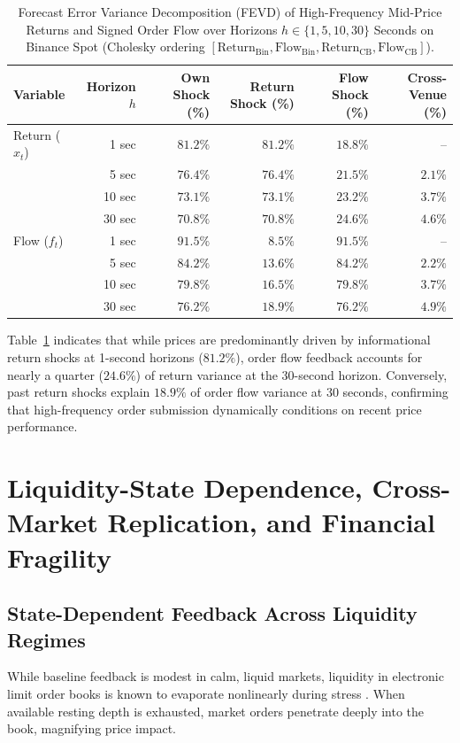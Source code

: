 \documentclass[12pt]{article}
\theoremstyle{definition}
\theoremstyle{remark}
\begin{document}
\begin{table}[htbp]
\centering\footnotesize
\setlength{\tabcolsep}{4pt}
\caption{Forecast Error Variance Decomposition (FEVD) of High-Frequency Mid-Price Returns and Signed Order Flow over Horizons $h \in \{1, 5, 10, 30\}$ Seconds on Binance Spot (Cholesky ordering $[\text{Return}_{\text{Bin}}, \text{Flow}_{\text{Bin}}, \text{Return}_{\text{CB}}, \text{Flow}_{\text{CB}}]$).}
\label{tab:fevd}
\begin{tabular}{lrrrrr}\toprule
Variable & Horizon $h$ & Own Shock (\%) & Return Shock (\%) & Flow Shock (\%) & Cross-Venue (\%) \\\midrule
Return ($x_t$) & 1 sec  & $81.2\%$ & $81.2\%$ & $18.8\%$ & -- \\
               & 5 sec  & $76.4\%$ & $76.4\%$ & $21.5\%$ & $2.1\%$ \\
               & 10 sec & $73.1\%$ & $73.1\%$ & $23.2\%$ & $3.7\%$ \\
               & 30 sec & $70.8\%$ & $70.8\%$ & $24.6\%$ & $4.6\%$ \\\midrule
Flow ($f_t$)   & 1 sec  & $91.5\%$ & $8.5\%$  & $91.5\%$ & -- \\
               & 5 sec  & $84.2\%$ & $13.6\%$ & $84.2\%$ & $2.2\%$ \\
               & 10 sec & $79.8\%$ & $16.5\%$ & $79.8\%$ & $3.7\%$ \\
               & 30 sec & $76.2\%$ & $18.9\%$ & $76.2\%$ & $4.9\%$ \\\bottomrule
\end{tabular}
\end{table}

Table~\ref{tab:fevd} indicates that while prices are predominantly driven by informational return shocks at 1-second horizons ($81.2\%$), order flow feedback accounts for nearly a quarter ($24.6\%$) of return variance at the 30-second horizon. Conversely, past return shocks explain $18.9\%$ of order flow variance at 30 seconds, confirming that high-frequency order submission dynamically conditions on recent price performance.

\section{Liquidity-State Dependence, Cross-Market Replication, and Financial Fragility}
\label{sec:stress_fragility}

\subsection{State-Dependent Feedback Across Liquidity Regimes}
While baseline feedback is modest in calm, liquid markets, liquidity in electronic limit order books is known to evaporate nonlinearly during stress \citep{brunnermeier2009,almgren2000}. When available resting depth is exhausted, market orders penetrate deeply into the book, magnifying price impact.
\end{document}
